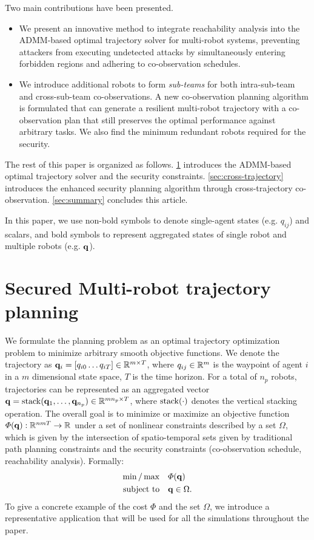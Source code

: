 \documentclass[10pt,twocolumn,twoside]{IEEEtran}
\begin{document}
\noindent{} 
Two main contributions have been presented. 
\begin{itemize}
  \item We present an innovative method to integrate reachability analysis into the ADMM-based optimal trajectory solver for multi-robot systems, preventing attackers from executing undetected attacks by simultaneously entering forbidden regions and adhering to co-observation schedules.
  \item We introduce additional robots to form \emph{sub-teams} for both intra-sub-team and cross-sub-team co-observations. A new co-observation planning algorithm is formulated that can generate a resilient multi-robot trajectory with a co-observation plan that still preserves the optimal performance against arbitrary tasks. We also find the minimum redundant robots required for the security.
\end{itemize}

The rest of this paper is organized as follows. \cref{sec:ADMM-planning} introduces the ADMM-based optimal trajectory solver and the security constraints. \cref{sec:cross-trajectory} introduces the enhanced security planning algorithm through cross-trajectory co-observation. \cref{sec:summary} concludes this article.

\noindent{} 
In this paper, we use non-bold symbols to denote single-agent states (e.g. $q_{ij}$) and scalars, and bold symbols to represent aggregated states of single robot and multiple robots (e.g. $\mathbf{q}$).

\section{Secured Multi-robot trajectory planning}\label{sec:ADMM-planning}
We formulate the planning problem as an optimal trajectory optimization problem to minimize arbitrary smooth objective functions. We denote the trajectory as $\mathbf{q}_i = [q_{i0}\dots q_{iT}]\in\mathbb{R}^{m\times T}{}$, where $q_{ij}\in\mathbb{R}^{m}{}$ is the waypoint of agent $i$ in a $m$ dimensional state space, $T$ is the time horizon. For a total of $n_p$ robots, trajectories can be represented as an aggregated vector $\mathbf{q} = \operatorname{stack}(\mathbf{q}_1,\dots,\mathbf{q}_{n_p})\in \mathbb{R}^{m n_p\times T}{}$, where $\operatorname{stack}(\cdot)$ denotes the vertical stacking operation. 
The overall goal is to minimize or maximize an objective function $\varPhi(\mathbf{q}):\mathbb{R}^{n m T}{} \to \mathbb{R}^{}{}$ under a set of nonlinear constraints described by a set $\Omega$, which is given by the intersection of spatio-temporal sets given by traditional path planning constraints and the security constraints (co-observation schedule, reachability analysis). Formally:
\begin{equation}\label{eq:general-problem}
	\begin{split}
		\min/\max & \quad \varPhi(\mathbf{q})\\
		\textrm{subject to} &\quad \mathbf{q} \in \Omega.
	\end{split}
\end{equation}
To give a concrete example of the cost $\varPhi$ and the set $\Omega$, we introduce a representative application that will be used for all the simulations throughout the paper.
\end{document}
